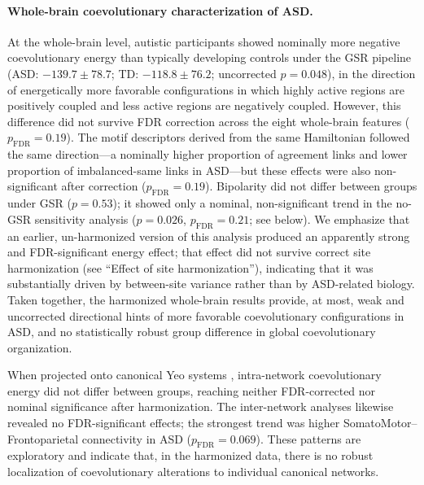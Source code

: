 \documentclass[10pt,letterpaper]{article}
\begin{document}
\paragraph*{Whole-brain coevolutionary characterization of ASD.}
At the whole-brain level, autistic participants showed nominally more negative coevolutionary energy
than typically developing controls under the GSR pipeline (ASD: $-139.7 \pm 78.7$; TD:
$-118.8 \pm 76.2$; uncorrected $p = 0.048$), in the direction of energetically more favorable
configurations in which highly active regions are positively coupled and less active regions are
negatively coupled. However, this difference did not survive FDR correction across the eight
whole-brain features ($p_{\mathrm{FDR}} = 0.19$). The motif descriptors derived from the same
Hamiltonian followed the same direction---a nominally higher proportion of agreement links and lower
proportion of imbalanced-same links in ASD---but these effects were also non-significant after
correction ($p_{\mathrm{FDR}} = 0.19$). Bipolarity did not differ between groups under GSR
($p = 0.53$); it showed only a nominal, non-significant trend in the no-GSR sensitivity analysis
($p = 0.026$, $p_{\mathrm{FDR}} = 0.21$; see below). We emphasize that an earlier, un-harmonized
version of this analysis produced an apparently strong and FDR-significant energy effect; that effect
did not survive correct site harmonization (see ``Effect of site harmonization''), indicating that
it was substantially driven by between-site variance rather than by ASD-related biology. Taken
together, the harmonized whole-brain results provide, at most, weak and uncorrected directional
hints of more favorable coevolutionary configurations in ASD, and no statistically robust group
difference in global coevolutionary organization.

When projected onto canonical Yeo systems \cite{Yeo2011}, intra-network coevolutionary energy did
not differ between groups, reaching neither FDR-corrected nor nominal significance after
harmonization. The inter-network analyses likewise revealed no FDR-significant effects; the strongest
trend was higher SomatoMotor--Frontoparietal connectivity in ASD ($p_{\mathrm{FDR}} = 0.069$). These
patterns are exploratory and indicate that, in the harmonized data, there is no robust localization
of coevolutionary alterations to individual canonical networks.
\end{document}
